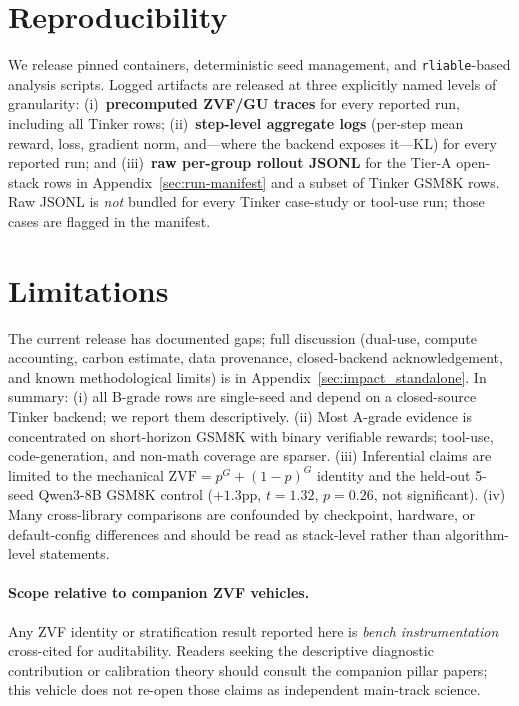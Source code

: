 \documentclass{article}
\begin{document}
\section{Reproducibility}
\label{sec:reproducibility}

We release pinned containers, deterministic seed management, and
\texttt{rliable}-based analysis scripts. Logged artifacts are released at
three explicitly named levels of granularity: (i)~\textbf{precomputed
ZVF/GU traces} for every reported run, including all Tinker rows;
(ii)~\textbf{step-level aggregate logs} (per-step mean reward, loss,
gradient norm, and---where the backend exposes it---KL) for every
reported run; and (iii)~\textbf{raw per-group rollout JSONL} for the
Tier-A open-stack rows in Appendix~\ref{sec:run-manifest} and a subset
of Tinker GSM8K rows. Raw JSONL is \emph{not} bundled for every Tinker
case-study or tool-use run; those cases are flagged in the manifest.



\section{Limitations}
\label{sec:limitations}

The current release has documented gaps; full discussion (dual-use,
compute accounting, carbon estimate, data provenance, closed-backend
acknowledgement, and known methodological limits) is in
Appendix~\ref{sec:impact_standalone}. In summary: (i) all B-grade rows are
single-seed and depend on a closed-source Tinker backend; we report them
descriptively. (ii) Most A-grade evidence is concentrated on
short-horizon GSM8K with binary verifiable rewards; tool-use,
code-generation, and non-math coverage are sparser. (iii) Inferential
claims are limited to the mechanical
$\mathrm{ZVF} = p^G + (1{-}p)^G$ identity and the held-out 5-seed
Qwen3-8B GSM8K control ($+1.3$pp, $t{=}1.32$, $p{=}0.26$, not
significant). (iv) Many cross-library comparisons are confounded by
checkpoint, hardware, or default-config differences and should be read
as stack-level rather than algorithm-level statements.

\paragraph{Scope relative to companion ZVF vehicles.}
Any ZVF identity or stratification result reported here is \emph{bench
instrumentation} cross-cited for auditability. Readers seeking the
descriptive diagnostic contribution or calibration theory should consult the
companion pillar papers; this vehicle does not re-open those claims as
independent main-track science.
\end{document}
